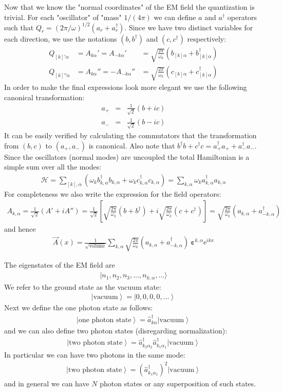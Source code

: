 \documentclass[onecolumn,fleqn]{revtex4}
\newcommand{\eexp}{\mathrm{e}^}
\newcommand{\beq}{\begin{eqnarray}}
\newcommand{\eeq}{\end{eqnarray}}
\begin{document}
Now that we know the "normal coordinates" of 
the EM field the quantization is trivial. 
For each "oscillator" of "mass" $1/(4\pi)$ 
we can define $a$ and $a^{\dag}$ operators
such that $Q_r=(2\pi/\omega)^{1/2}(a_r+a_r^{\dag})$.  
Since we have two distinct variables for each direction, 
we use the notations $(b, b^{\dag})$ and $(c, c^{\dag})$ respectively:
\beq
Q_{[k]'\alpha}
&= A_{k\alpha}'=A_{-k\alpha}' 
&= \sqrt{\frac{2\pi}{\omega_k}} \left(b_{[k]\alpha}+b_{[k]\alpha}^{\dag}\right)
\\ 
Q_{[k]''\alpha}
&= A_{k\alpha}''=-A_{-k\alpha}'' 
&= \sqrt{\frac{2\pi}{\omega_k}} \left(c_{[k]\alpha}+c_{[k]\alpha}^{\dag}\right)
\eeq
In order to make the final expressions look more elegant 
we use the following canonical transformation: 
\beq
a_{+} &=& \frac{1}{\sqrt{2}} (b+ic) 
\\ \nonumber
a_{-} &=& \frac{1}{\sqrt{2}} (b-ic) 
\eeq
It can be easily verified by calculating the commutators 
that the transformation from $(b,c)$ to $(a_{+},a_{-})$ 
is canonical. Also note that 
$b^{\dag}b+c^{\dag}c=a_{+}^{\dag}a_{+}+a_{-}^{\dag}a_{-}$. 
Since the oscillators (normal modes) are uncoupled 
the total Hamiltonian is a simple sum over all the modes: 
\beq
\mathcal{H} = \sum_{[k],\alpha} (\omega_kb_{k,\alpha}^{\dag}b_{k,\alpha}
+ \omega_kc_{k,\alpha}^{\dag} c_{k,\alpha})
= \sum_{k,\alpha} \omega_k a_{k,\alpha}^{\dag}a_{k,\alpha}
\eeq
For completeness we also write the expression for the field operators:
\beq
A_{k,\alpha} = \frac{1}{\sqrt{2}} (A'+iA'')
= \frac{1}{\sqrt{2}}\left[ 
\sqrt{\frac{2\pi}{\omega_k}}(b+b^{\dag}) 
+ i\sqrt{\frac{2\pi}{\omega_k}}(c+c^{\dag}) \right]
= \sqrt{\frac{2\pi}{\omega_k}}(a_{k,\alpha} + a_{-k,\alpha}^{\dag})
\eeq
and hence
\beq
\vec{A}(x) 
= \frac{1}{\sqrt{\mbox{volume}}} \sum_{k,\alpha} 
\sqrt{\frac{2\pi}{\omega_k}}(a_{k,\alpha} + a_{-k,\alpha}^{\dag})
\ \bm{\varepsilon}^{k,\alpha} \eexp{ikx} 
\eeq



The eigenstates of the EM field are
\beq
|n_{1},n_{2},n_{3}, \dots ,n_{k,\alpha}, \dots \rangle 
\eeq
We refer to the ground state as the vacuum state: 
\beq
\left\vert \mbox{vacuum} \right\rangle =
\left\vert 0,0,0,0, \dots  \right\rangle  
\eeq
Next we define the one photon state as follows: 
\beq
\left\vert \mbox{one photon state} \right\rangle =
\hat{a}_{k\alpha}^{\dag}
\left\vert \mbox{vacuum} \right\rangle  
\eeq
and we can also define two photon states (disregarding normalization): 
\beq
\left\vert \mbox{two photon state} \right\rangle =
\hat{a}_{k_2\alpha_2}^{\dag}\hat{a}_{k_1\alpha_1}^{\dag} 
\left\vert  \mbox{vacuum} \right\rangle 
\eeq
In particular we can have two photons in the same mode:
\beq
\left\vert \mbox{two photon state} \right\rangle =
(\hat{a}_{k_1\alpha_1}^{\dag})^2 
\left\vert  \mbox{vacuum} \right\rangle 
\eeq
and in general we can have $N$ photon states or any 
superposition of such states. 
\end{document}
